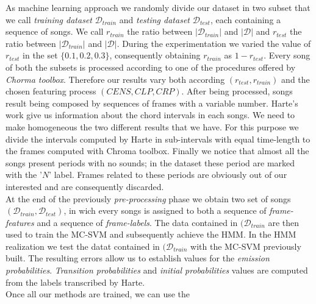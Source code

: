 As machine learning approach we randomly divide our dataset in two subset that we call \textit{training dataset} $\mathcal{D}_{train}$ and \textit{testing dataset}  $\mathcal{D}_{test}$, each containing a sequence of songs. We call $r_{train}$ the ratio between $|\mathcal{D}_{train}|$ and $|\mathcal{D}|$ and $r_{test}$ the ratio between $|\mathcal{D}_{train}|$ and $|\mathcal{D}|$. During the experimentation we varied the value of $r_{test}$ in the set $\{0.1,0.2,0.3\}$, consequently obtaining $r_{train}$ as $1-r_{test}$. Every song of both the subsets is processed according to one of the procedures offered by \textit{Chorma toolbox}. Therefore our results vary both according $(r_{test},r_{train})$ and the chosen featuring process $(CENS,CLP,CRP)$. After being processed, songs result being composed by sequences of frames with a variable number. Harte's work give us information about the chord intervals in each songs. We need to make homogeneous the two different results that we have. For this purpose we divide the intervals computed by Harte in sub-intervals with equal time-length to the frames computed with Chroma toolbox. Finally we notice that almost all the songs present periods with no sounds; in the dataset these period are marked with the '$N$' label. Frames related to these periods are obviously out of our interested and are consequently discarded. \\
%
At the end of the previously \textit{pre-processing} phase we obtain two set of songs $(\mathcal{D}_{train},\mathcal{D}_{test})$, in wich every songs is assigned to both a sequence of \textit{frame-features} and a sequence of \textit{frame-labels}. The data contained in $(\mathcal{D}_{train}$ are then used to train the MC-SVM and subsequently achieve the HMM. In the HMM realization we test the datat contained in $(\mathcal{D}_{train}$ with the MC-SVM previously built. The resulting errors allow us to establish values for the \textit{emission probabilities}. \textit{Transition probabilities} and \textit{initial probabilities} values are computed from the labels transcribed by Harte. \\
%
Once all our methods are trained, we can use the 
